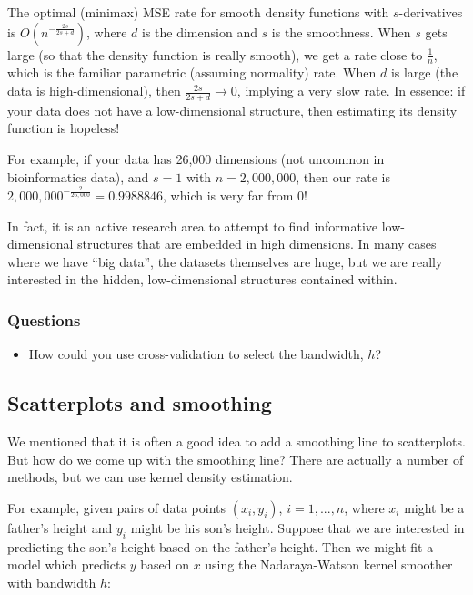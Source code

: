 The optimal (minimax) MSE rate for smooth density functions with $s$-derivatives is $O\left( n^{-\frac{2s}{2s + d}}\right)$, where $d$ is the dimension and $s$ is the smoothness. When $s$ gets large (so that the density function is really smooth), we get a rate close to $\frac{1}{n}$, which is the familiar parametric (assuming normality) rate. When $d$ is large (the data is high-dimensional), then $\frac{2s}{2s + d} \rightarrow 0$, implying a very slow rate. In essence: if your data does not have a low-dimensional structure, then estimating its density function is hopeless!

For example, if your data has 26,000 dimensions (not uncommon in bioinformatics data), and $s = 1$ with $n = 2,000,000$, then our rate is $2,000,000^{-\frac{2}{26,000}} = 0.9988846$, which is very far from 0!



In fact, it is an active research area to attempt to find informative low-dimensional structures that are embedded in high dimensions. In many cases where we have ``big data'', the datasets themselves are huge, but we are really interested in the hidden, low-dimensional structures contained within.


\subsubsection*{Questions}

\begin{itemize}
\item  How could you use cross-validation to select the bandwidth, $h$?
\end{itemize}






\subsection*{Scatterplots and smoothing}

We mentioned that it is often a good idea to add a smoothing line to scatterplots. But how do we come up with the smoothing line? There are actually a number of methods, but we can use kernel density estimation.

For example, given pairs of data points $(x_i, y_i)$, $i = 1, ..., n$, where $x_i$ might be a father's height and $y_i$ might be his son's height. Suppose that we are interested in predicting the son's height based on the father's height. Then we might fit a model which predicts $y$ based on $x$ using the Nadaraya-Watson kernel smoother with bandwidth $h$:

